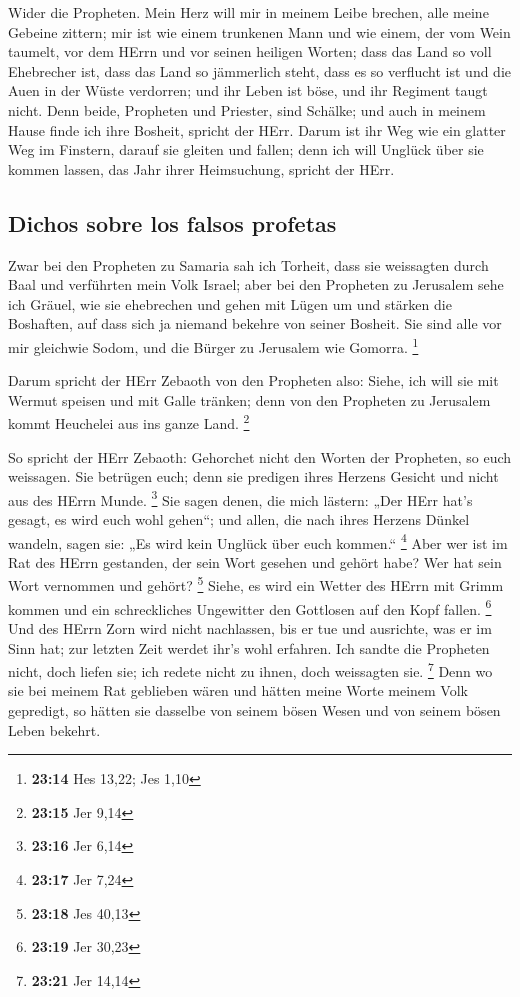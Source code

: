  Wider die Propheten. Mein Herz will mir in meinem Leibe
brechen, alle meine Gebeine zittern; mir ist wie einem trunkenen Mann
und wie einem, der vom Wein taumelt, vor dem HErrn und vor seinen
heiligen Worten;  dass das Land so voll Ehebrecher ist,
dass das Land so jämmerlich steht, dass es so verflucht ist und die Auen
in der Wüste verdorren; und ihr Leben ist böse, und ihr Regiment taugt
nicht.  Denn beide, Propheten und Priester, sind Schälke;
und auch in meinem Hause finde ich ihre Bosheit, spricht der HErr.
 Darum ist ihr Weg wie ein glatter Weg im Finstern,
darauf sie gleiten und fallen; denn ich will Unglück über sie kommen
lassen, das Jahr ihrer Heimsuchung, spricht der HErr.

\hypertarget{dichos-sobre-los-falsos-profetas}{%
\subsection{Dichos sobre los falsos
profetas}\label{dichos-sobre-los-falsos-profetas}}

 Zwar bei den Propheten zu Samaria sah ich Torheit, dass
sie weissagten durch Baal und verführten mein Volk Israel;
 aber bei den Propheten zu Jerusalem sehe ich Gräuel, wie
sie ehebrechen und gehen mit Lügen um und stärken die Boshaften, auf
dass sich ja niemand bekehre von seiner Bosheit. Sie sind alle vor mir
gleichwie Sodom, und die Bürger zu Jerusalem wie Gomorra. \footnote{\textbf{23:14}
  Hes 13,22; Jes 1,10}

 Darum spricht der HErr Zebaoth von den Propheten also:
Siehe, ich will sie mit Wermut speisen und mit Galle tränken; denn von
den Propheten zu Jerusalem kommt Heuchelei aus ins ganze Land.
\footnote{\textbf{23:15} Jer 9,14}

 So spricht der HErr Zebaoth: Gehorchet nicht den Worten
der Propheten, so euch weissagen. Sie betrügen euch; denn sie predigen
ihres Herzens Gesicht und nicht aus des HErrn Munde. \footnote{\textbf{23:16}
  Jer 6,14}  Sie sagen denen, die mich lästern: „Der HErr
hat's gesagt, es wird euch wohl gehen``; und allen, die nach ihres
Herzens Dünkel wandeln, sagen sie: „Es wird kein Unglück über euch
kommen.`` \footnote{\textbf{23:17} Jer 7,24}  Aber wer
ist im Rat des HErrn gestanden, der sein Wort gesehen und gehört habe?
Wer hat sein Wort vernommen und gehört? \footnote{\textbf{23:18} Jes
  40,13}  Siehe, es wird ein Wetter des HErrn mit Grimm
kommen und ein schreckliches Ungewitter den Gottlosen auf den Kopf
fallen. \footnote{\textbf{23:19} Jer 30,23}  Und des
HErrn Zorn wird nicht nachlassen, bis er tue und ausrichte, was er im
Sinn hat; zur letzten Zeit werdet ihr's wohl erfahren. 
Ich sandte die Propheten nicht, doch liefen sie; ich redete nicht zu
ihnen, doch weissagten sie. \footnote{\textbf{23:21} Jer 14,14}
 Denn wo sie bei meinem Rat geblieben wären und hätten
meine Worte meinem Volk gepredigt, so hätten sie dasselbe von seinem
bösen Wesen und von seinem bösen Leben bekehrt.

